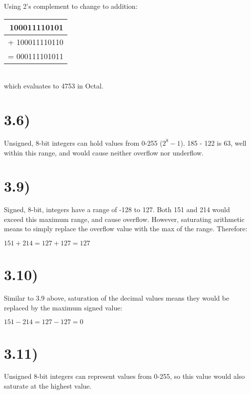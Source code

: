 \documentclass[a4paper,11pt]{article}
\begin{document}
Using 2's complement to change to addition: \\

\begin{tabular}{ r   }	
   100011110101 \\
  \hline
  + 100011110110 \\
  \hline
  \hline
  = 000111101011 \\
\end{tabular} \\

which evaluates to 4753 in Octal.



\section*{3.6)} 
Unsigned, 8-bit integers can hold values from 0-255 ($2^8 - 1$).  185 - 122 is 63, well within this range, and would cause neither overflow nor underflow.


\section*{3.9)} 
Signed, 8-bit, integers have a range of -128 to 127.  Both 151 and 214 would exceed this maximum range, and cause overflow.  However, saturating arithmetic means to simply replace the overflow value with the max of the range.  Therefore:

$151+214=127+127=127$


\section*{3.10)} 
Similar to 3.9 above, saturation of the decimal values means they would be replaced by the maximum signed value:

$151-214=127-127=0$


\section*{3.11)} 
Unsigned 8-bit integers can represent values from 0-255, so this value would also saturate at the highest value.
\end{document}
